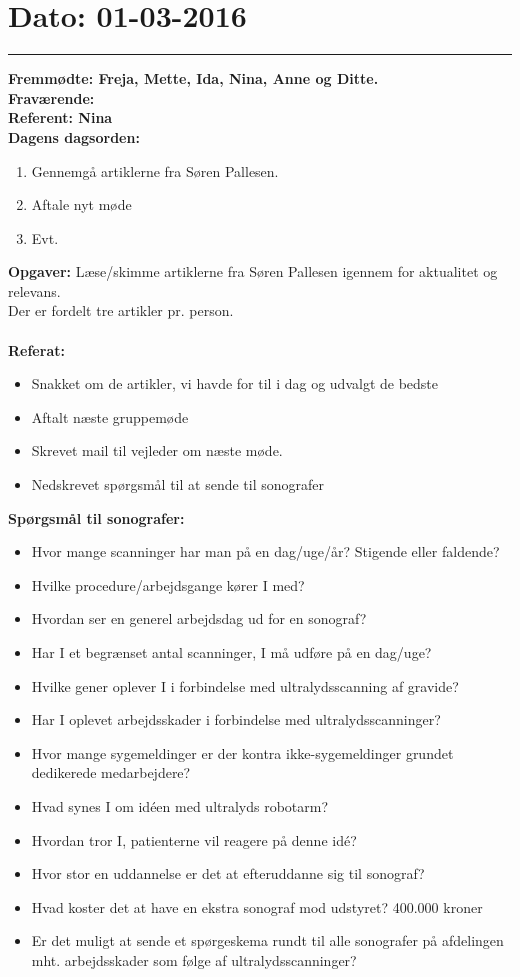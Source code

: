 \section{Dato: 01-03-2016}
\hrule
\textbf{Fremmødte: Freja, Mette, Ida, Nina, Anne og Ditte.} \\
\textbf{Fraværende:} \\
\textbf{Referent: Nina } \\
\textbf{Dagens dagsorden: }
\begin{enumerate}
	\item Gennemgå artiklerne fra Søren Pallesen.
	\item Aftale nyt møde
	\item Evt. 
\end{enumerate}

\textbf{Opgaver:} \newline
Læse/skimme artiklerne fra Søren Pallesen igennem for aktualitet og relevans. \\
Der er fordelt tre artikler pr. person.\\\\
\textbf{Referat:}
\begin{itemize}
\item Snakket om de artikler, vi havde for til i dag og udvalgt de bedste
\item Aftalt næste gruppemøde
\item Skrevet mail til vejleder om næste møde.
\item Nedskrevet spørgsmål til at sende til sonografer
\end{itemize}
\textbf{Spørgsmål til sonografer:}
\begin{itemize}
\item Hvor mange scanninger har man på en dag/uge/år? Stigende eller faldende?
\item Hvilke procedure/arbejdsgange kører I med?
\item Hvordan ser en generel arbejdsdag ud for en sonograf?
\item Har I et begrænset antal scanninger, I må udføre på en dag/uge?
\item Hvilke gener oplever I i forbindelse med ultralydsscanning af gravide?
\item Har I oplevet arbejdsskader i forbindelse med ultralydsscanninger?
\item Hvor mange sygemeldinger er der kontra ikke-sygemeldinger grundet dedikerede medarbejdere?
\item Hvad synes I om idéen med ultralyds robotarm?
\item Hvordan tror I, patienterne vil reagere på denne idé?
\item Hvor stor en uddannelse er det at efteruddanne sig til sonograf?
\item Hvad koster det at have en ekstra sonograf mod udstyret?
400.000 kroner
\item Er det muligt at sende et spørgeskema rundt til alle sonografer på afdelingen mht. arbejdsskader som følge af ultralydsscanninger?
\end{itemize}
